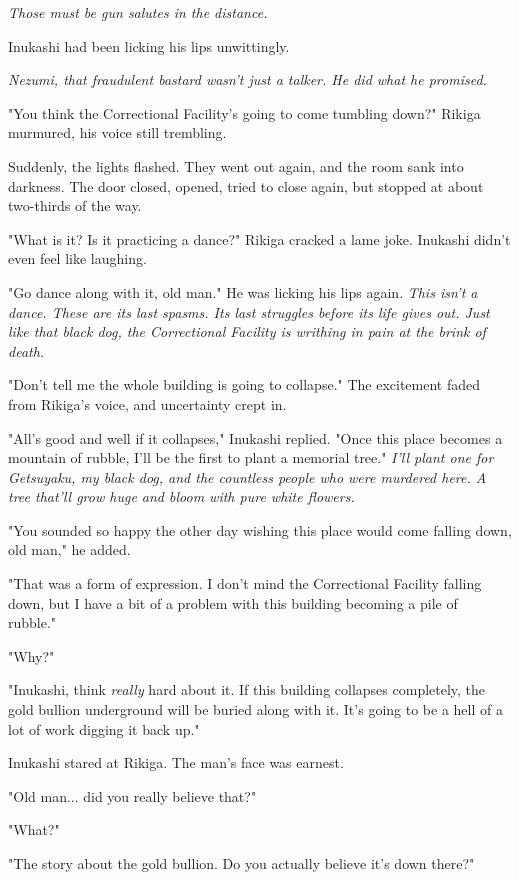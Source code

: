 \emph{Those must be gun salutes in the distance.}

Inukashi had been licking his lips unwittingly.

\emph{Nezumi, that fraudulent bastard wasn't just a talker. He did what he
promised.}

"You think the Correctional Facility's going to come tumbling down?"
Rikiga murmured, his voice still trembling.

Suddenly, the lights flashed. They went out again, and the room sank
into darkness. The door closed, opened, tried to close again, but
stopped at about two-thirds of the way.

"What is it? Is it practicing a dance?" Rikiga cracked a lame joke.
Inukashi didn't even feel like laughing.

"Go dance along with it, old man." He was licking his lips again. \emph{This
isn't a dance. These are its last spasms. Its last struggles before its
life gives out. Just like that black dog, the Correctional Facility is
writhing in pain at the brink of death.}

\mybreak

"Don't tell me the whole building is going to collapse." The excitement
faded from Rikiga's voice, and uncertainty crept in.

"All's good and well if it collapses," Inukashi replied. "Once this
place becomes a mountain of rubble, I'll be the first to plant a
memorial tree." \emph{I'll plant one for Getsuyaku, my black dog, and the
countless people who were murdered here. A tree that'll grow huge and
bloom with pure white flowers.}

"You sounded so happy the other day wishing this place would come
falling down, old man," he added.

"That was a form of expression. I don't mind the Correctional Facility
falling down, but I have a bit of a problem with this building becoming
a pile of rubble."~

"Why?"

"Inukashi, think \emph{really} hard about it. If this building collapses
completely, the gold bullion underground will be buried along with it.
It's going to be a hell of a lot of work digging it back up."

Inukashi stared at Rikiga. The man's face was earnest.

"Old man... did you really believe that?"

"What?"

"The story about the gold bullion. Do you actually believe it's down
there?"

